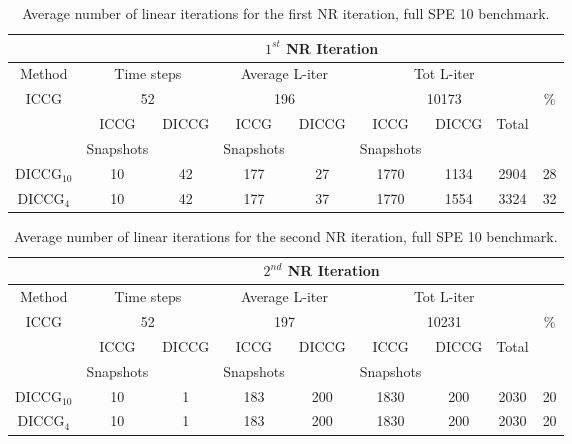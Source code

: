 \documentclass[12pt]{article}
\begin{document}
\begin{table}[!ht]\centering
\begin{minipage}{1\textwidth}
\vspace{-10pt}
\centering
\begin{tabular}{ |c|c|c|c|c|c|c|c|c|} 
  \hline
  & \multicolumn{8}{c|}{$1^{st}$ NR Iteration}  \\
\hline
Method&  \multicolumn{2}{c|}{Time steps} &\multicolumn{2}{c|}{Average L-iter} & \multicolumn{3}{c|}{Tot L-iter}&\\
\hline
 ICCG&\multicolumn{2}{c|}{52} & \multicolumn{2}{c|}{196}& \multicolumn{3}{c|}{10173} &\%\\
\hline
&ICCG&DICCG&ICCG&DICCG&ICCG&DICCG&Total&\\
&Snapshots&&Snapshots&&Snapshots&&&\\
\hline
DICCG$_{10}$&10&42&177&27&1770&1134&2904&28 \\
DICCG$_4$ &10&42&177&37&1770&1554&3324&32  \\
\hline
 \end{tabular}
\caption{Average number of linear iterations for the first NR iteration, full SPE 10 benchmark.}\label{table:literspe1}
\end{minipage}
\end{table}


\begin{table}[!ht]\centering
\begin{minipage}{1\textwidth}
\vspace{-10pt}
\centering
\begin{tabular}{ |c|c|c|c|c|c|c|c|c|} 
  \hline
  & \multicolumn{8}{c|}{$2^{nd}$ NR Iteration}  \\
\hline
Method&  \multicolumn{2}{c|}{Time steps} &\multicolumn{2}{c|}{Average L-iter} & \multicolumn{3}{c|}{Tot L-iter}&\\
\hline
 ICCG&\multicolumn{2}{c|}{52} & \multicolumn{2}{c|}{197}& \multicolumn{3}{c|}{10231} &\%\\
\hline
&ICCG&DICCG&ICCG&DICCG&ICCG&DICCG&Total&\\
&Snapshots&&Snapshots&&Snapshots&&&\\
\hline
DICCG$_{10}$&10&1&183&200&1830&200&2030&20 \\
DICCG$_4$ &10&1&183&200&1830&200&2030&20 \\

\hline
 \end{tabular}
\caption{Average number of linear iterations for the second NR iteration, full SPE 10 benchmark.}\label{table:literspe1}
\end{minipage}
\end{table}
\end{document}

